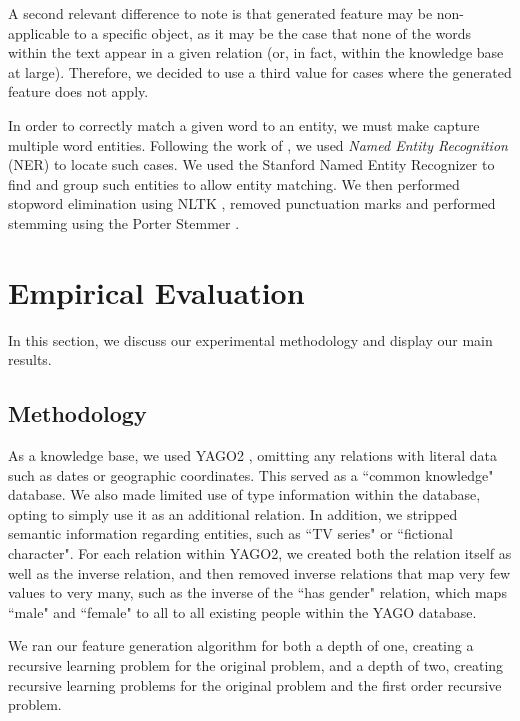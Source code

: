 \documentclass[twoside,11pt]{article}
\theoremstyle{definition}
\begin{document}
A second relevant difference to note is that generated feature may be non-applicable to a specific object, as it may be the case that none of the words within the text appear in a given relation (or, in fact, within the knowledge base at large). Therefore, we decided to use a third value for cases where the generated feature does not apply.

In order to correctly match a given word to an entity, we must make capture multiple word entities. Following the work of , we used \emph{Named Entity Recognition} (NER) to locate such cases. We used the Stanford Named Entity Recognizer \cite{finkel2005incorporatingfull} to find and group such entities to allow entity matching. We then performed stopword elimination using NLTK \cite{bird2009natural} , removed punctuation marks and performed stemming using the Porter Stemmer \cite{van1980new}.


\section{Empirical Evaluation}
In this section, we discuss our experimental methodology and display our main results.
\subsection{Methodology}

As a knowledge base, we used YAGO2 \cite{hoffart2013yago2}, omitting any relations with literal data such as dates or geographic coordinates. This served as a ``common knowledge" database. We also made limited use of type information within the database, opting to simply use it as an additional relation.
In addition, we stripped semantic information regarding entities, such as ``TV series" or ``fictional character". For each relation within YAGO2, we created both the relation itself as well as the inverse relation, and then removed inverse relations that map very few values to very many, such as the inverse of the ``has gender" relation, which maps ``male" and ``female" to all to all existing people within the YAGO database.

We ran our feature generation algorithm for both a depth of one, creating a recursive learning problem for the original problem, and a depth of two, creating recursive learning problems for the original problem and the first order recursive problem.
\end{document}
